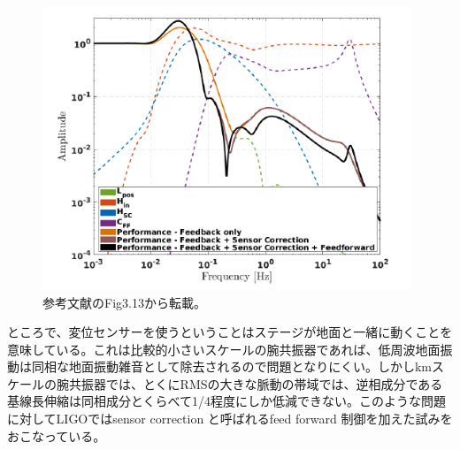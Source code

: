 \begin{figure}[H]
  \begin{center}
    \includegraphics[width=11.0cm]{../arm_length_compensation_system/img_pi_fb_sc_ff.png}
  \end{center}
  \caption{参考文献\cite{biscansD2018}のFig3.13から転載。}
  \label{img:img_pi_fb_sc_ff}
\end{figure}

ところで、変位センサーを使うということはステージが地面と一緒に動くことを意味している。これは比較的小さいスケールの腕共振器であれば、低周波地面振動は同相な地面振動雑音として除去されるので問題となりにくい。しかしkmスケールの腕共振器では、とくにRMSの大きな脈動の帯域では、逆相成分である基線長伸縮は同相成分とくらべて1/4程度にしか低減できない\cite{miyo2018cdmr}。このような問題に対してLIGOではsensor correction と呼ばれるfeed forward 制御を加えた試みをおこなっている\cite{hua2005low}\cite{matichard2015seismic}。


